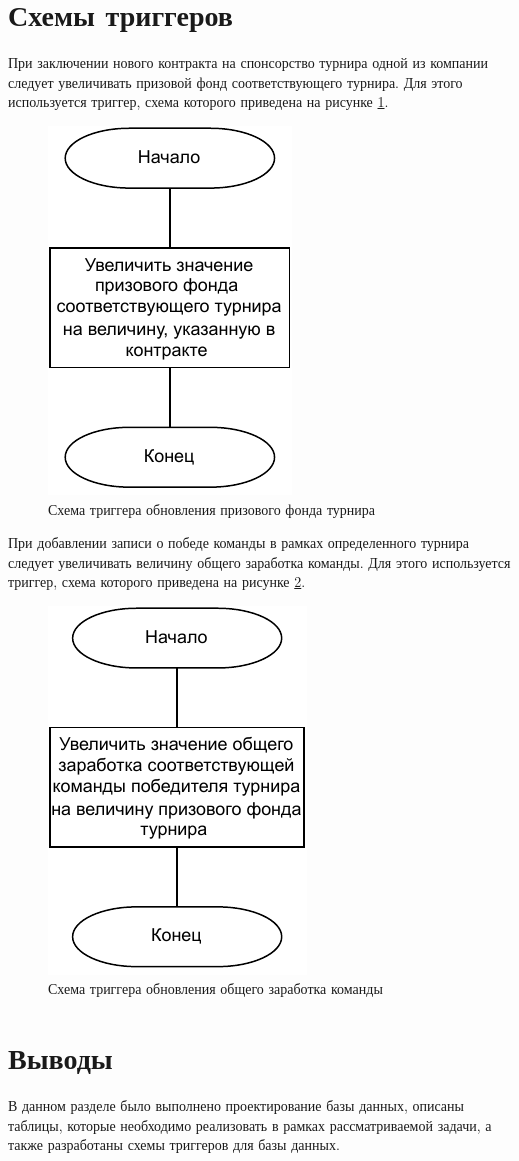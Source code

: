 \newpage

\section{Схемы триггеров}

При заключении нового контракта на спонсорство турнира одной из компании следует увеличивать призовой фонд соответствующего турнира. Для этого используется триггер, схема которого приведена на рисунке \ref{fig:new_sponsorship}.

\begin{figure}[h!btp]
	\centering
	\includegraphics{inc/diag/new_sponsorship.pdf}
	\caption{Схема триггера обновления призового фонда турнира}
	\label{fig:new_sponsorship}	
\end{figure}

При добавлении записи о победе команды в рамках определенного турнира следует увеличивать величину общего заработка команды. Для этого используется триггер, схема которого приведена на рисунке \ref{fig:new_winner}.

\begin{figure}[h!btp]
	\centering
	\includegraphics{inc/diag/new_winner.pdf}
	\caption{Схема триггера обновления общего заработка команды}
	\label{fig:new_winner}	
\end{figure}

\section{Выводы}

В данном разделе было выполнено проектирование базы данных, описаны таблицы, которые необходимо реализовать в рамках рассматриваемой задачи, а также разработаны схемы триггеров для базы данных.


